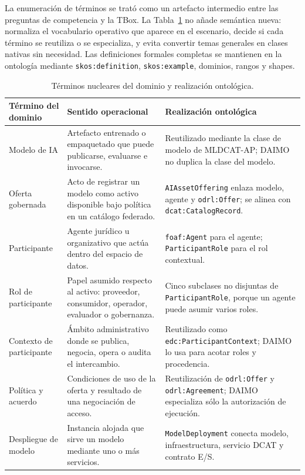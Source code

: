 \documentclass[Afour,sagev,times]{sagej}
\newcommand{\code}[1]{\texttt{#1}}
\begin{document}
La enumeración de términos se trató como un artefacto intermedio entre las preguntas de competencia y la TBox. La Tabla~\ref{tab:domain-terms} no añade semántica nueva: normaliza el vocabulario operativo que aparece en el escenario, decide si cada término se reutiliza o se especializa, y evita convertir temas generales en clases nativas sin necesidad. Las definiciones formales completas se mantienen en la ontología mediante \code{skos:definition}, \code{skos:example}, dominios, rangos y shapes.

\begin{table}[tb]
\scriptsize\sf\centering
\caption{Términos nucleares del dominio y realización ontológica.\label{tab:domain-terms}}
\begin{tabular}{@{}p{2.8cm}p{4.9cm}p{6.8cm}@{}}
\toprule
\textbf{Término del dominio} & \textbf{Sentido operacional} & \textbf{Realización ontológica} \\
\midrule
Modelo de IA & Artefacto entrenado o empaquetado que puede publicarse, evaluarse e invocarse. & Reutilizado mediante la clase de modelo de MLDCAT-AP; DAIMO no duplica la clase del modelo. \\
Oferta gobernada & Acto de registrar un modelo como activo disponible bajo política en un catálogo federado. & \code{AIAssetOffering} enlaza modelo, agente y \code{odrl:Offer}; se alinea con \code{dcat:CatalogRecord}. \\
Participante & Agente jurídico u organizativo que actúa dentro del espacio de datos. & \code{foaf:Agent} para el agente; \code{ParticipantRole} para el rol contextual. \\
Rol de participante & Papel asumido respecto al activo: proveedor, consumidor, operador, evaluador o gobernanza. & Cinco subclases no disjuntas de \code{ParticipantRole}, porque un agente puede asumir varios roles. \\
Contexto de participante & Ámbito administrativo donde se publica, negocia, opera o audita el intercambio. & Reutilizado como \code{edc:ParticipantContext}; DAIMO lo usa para acotar roles y procedencia. \\
Política y acuerdo & Condiciones de uso de la oferta y resultado de una negociación de acceso. & Reutilización de \code{odrl:Offer} y \code{odrl:Agreement}; DAIMO especializa sólo la autorización de ejecución. \\
Despliegue de modelo & Instancia alojada que sirve un modelo mediante uno o más servicios. & \code{ModelDeployment} conecta modelo, infraestructura, servicio DCAT y contrato E/S. \\

\end{tabular}
\end{table}
\end{document}
